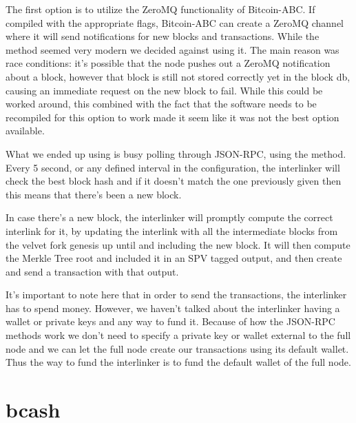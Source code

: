 The first option is to utilize the ZeroMQ functionality of Bitcoin-ABC. If compiled with the appropriate flags, Bitcoin-ABC can create a ZeroMQ channel where it will send notifications for new blocks and transactions. While the method seemed very modern we decided against using it. The main reason was race conditions: it's possible that the node pushes out a ZeroMQ notification about a block, however that block is still not stored correctly yet in the block db, causing an immediate  request on the new block to fail. While this could be worked around, this combined with the fact that the software needs to be recompiled for this option to work made it seem like it was not the best option available.

What we ended up using is busy polling through JSON-RPC, using the  method. Every 5 second, or any defined interval in the configuration, the interlinker will check the best block hash and if it doesn't match the one previously given then this means that there's been a new block.

In case there's a new block, the interlinker will promptly compute the correct interlink for it, by updating the interlink with all the intermediate blocks from the velvet fork genesis up until and including the new block. It will then compute the Merkle Tree root and included it in an SPV tagged output, and then create and send a transaction with that output.

It's important to note here that in order to send the transactions, the interlinker has to spend money. However, we haven't talked about the interlinker having a wallet or private keys and any way to fund it. Because of how the JSON-RPC methods work we don't need to specify a private key or wallet external to the full node and we can let the full node create our transactions using its default wallet. Thus the way to fund the interlinker is to fund the default wallet of the full node.

\section{bcash}
